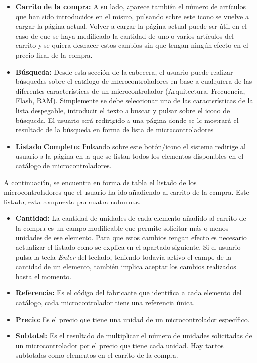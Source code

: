 \begin{itemize}
	\item \textbf{Carrito de la compra:} A su lado, aparece también el número de artículos que han sido introducidos en el mismo, pulsando sobre este icono se vuelve a cargar la página actual. Volver a cargar la página actual puede ser útil en el caso de que se haya modificado la cantidad de uno o varios artículos del carrito y se quiera deshacer estos cambios sin que tengan ningún efecto en el precio final de la compra.

	\item \textbf{Búsqueda:} Desde esta sección de la cabecera, el usuario puede realizar búsquedas sobre el catálogo de microcontroladores en base a cualquiera de las diferentes características de un microcontrolador (Arquitectura, Frecuencia, Flash, RAM). Simplemente se debe seleccionar una de las características de la lista despegable, introducir el texto a buscar y pulsar sobre el icono de búsqueda.
	El usuario será redirigido a una página donde se le mostrará el resultado de la búsqueda en forma de lista de microcontroladores.

	\item \textbf{Listado Completo:} Pulsando sobre este botón/icono el sistema redirige al usuario a la página en la que se listan todos los elementos disponibles en el catálogo de microcontroladores.
\end{itemize}

A continuación, se encuentra en forma de tabla el listado de los microcontroladores que el usuario ha ido añadiendo al carrito de la compra. Este listado, esta compuesto por cuatro columnas: 
\begin{itemize}
	\item \textbf{Cantidad:} La cantidad de unidades de cada elemento añadido al carrito de la compra es un campo modificable que permite	solicitar más o menos unidades de ese elemento. Para que estos cambios tengan efecto es necesario actualizar el listado como se explica en el apartado siguiente. Si el usuario pulsa la tecla \textit{Enter} del teclado, teniendo todavía activo el campo de la cantidad de un elemento, también implica aceptar los cambios realizados hasta el momento.
	
	\item \textbf{Referencia:} Es el código del fabricante que identifica a cada elemento del catálogo, cada microcontrolador
	tiene una referencia única.
	
	\item \textbf{Precio:} Es el precio que tiene una unidad de un microcontrolador específico.

	\item \textbf{Subtotal:} Es el resultado de multiplicar el número de unidades solicitadas de un microcontrolador por el precio que tiene cada unidad. Hay tantos subtotales como elementos en el carrito de la compra.
\end{itemize}

